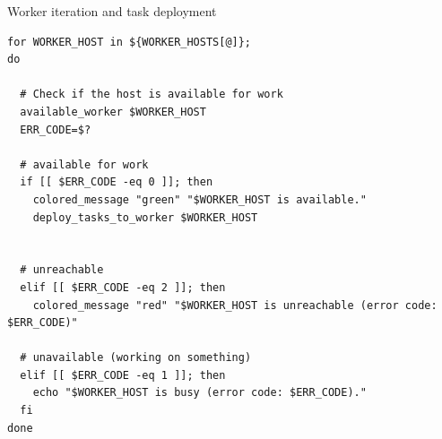 \begin{listing}[!ht]
\caption{Worker iteration and task deployment}
\label{lst:WorkerTaskDeploy}
\begin{verbatim}
for WORKER_HOST in ${WORKER_HOSTS[@]};
do

  # Check if the host is available for work
  available_worker $WORKER_HOST
  ERR_CODE=$?

  # available for work
  if [[ $ERR_CODE -eq 0 ]]; then
    colored_message "green" "$WORKER_HOST is available."
    deploy_tasks_to_worker $WORKER_HOST


  # unreachable
  elif [[ $ERR_CODE -eq 2 ]]; then
    colored_message "red" "$WORKER_HOST is unreachable (error code: $ERR_CODE)"

  # unavailable (working on something)
  elif [[ $ERR_CODE -eq 1 ]]; then
    echo "$WORKER_HOST is busy (error code: $ERR_CODE)."
  fi
done
\end{verbatim}
\end{listing}